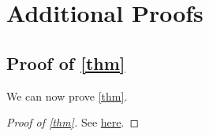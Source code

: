 \chapter{Additional Proofs}
\section{Proof of \autoref{thm}}\label{appendix}
We can now prove \autoref{thm}.
\begin{proof}[Proof of \autoref{thm}]
	See \href{https://en.wikipedia.org/wiki/Mass%E2%80%93energy_equivalence}{here}.
\end{proof}